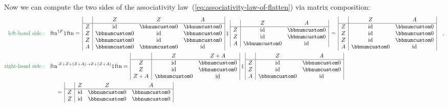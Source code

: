 Now we can compute the two sides of the associativity law~(\ref{eq:associativity-law-of-flatten})
via matrix composition:
\begin{align*}
{\color{greenunder}\text{left-hand side}:}\quad & \text{ftn}^{\uparrow F}\bef\text{ftn}=\,\begin{array}{|c|ccc|}
 & Z & Z & A\\
\hline Z & \text{id} & \bbnum 0 & \bbnum 0\\
Z & \bbnum 0 & \text{id} & \bbnum 0\\
Z & \bbnum 0 & \text{id} & \bbnum 0\\
A & \bbnum 0 & \bbnum 0 & \text{id}
\end{array}\,\bef\,\begin{array}{|c|cc|}
 & Z & A\\
\hline Z & \text{id} & \bbnum 0\\
Z & \text{id} & \bbnum 0\\
A & \bbnum 0 & \text{id}
\end{array}\,=\,\begin{array}{|c|cc|}
 & Z & A\\
\hline Z & \text{id} & \bbnum 0\\
Z & \text{id} & \bbnum 0\\
Z & \text{id} & \bbnum 0\\
A & \bbnum 0 & \text{id}
\end{array}\quad,\\
{\color{greenunder}\text{right-hand side}:}\quad & \text{ftn}^{:Z+Z+\left(Z+A\right)\rightarrow Z+\left(Z+A\right)}\bef\text{ftn}=\,\begin{array}{|c|cc|}
 & Z & Z+A\\
\hline Z & \text{id} & \bbnum 0\\
Z & \text{id} & \bbnum 0\\
Z+A & \bbnum 0 & \gunderline{\text{id}}
\end{array}\,\bef\,\begin{array}{|c|cc|}
 & Z & A\\
\hline Z & \text{id} & \bbnum 0\\
Z & \text{id} & \bbnum 0\\
A & \bbnum 0 & \text{id}
\end{array}\\
 & \quad=\,\begin{array}{|c|ccc|}
 & Z & Z & A\\
\hline Z & \text{id} & \bbnum 0 & \bbnum 0\\
Z & \text{id} & \bbnum 0 & \bbnum 0\\

\end{array}
\end{align*}
